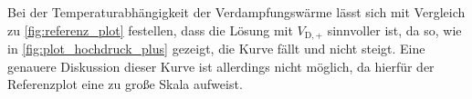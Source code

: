 Bei der Temperaturabhängigkeit der Verdampfungswärme lässt sich mit Vergleich zu \autoref{fig:referenz_plot} festellen, dass die Lösung mit $V_{\text{D},+}$ sinnvoller ist, da so, wie in \autoref{fig:plot_hochdruck_plus} gezeigt, die Kurve fällt und nicht steigt.
Eine genauere Diskussion dieser Kurve ist allerdings nicht möglich, da hierfür der Referenzplot eine zu große Skala aufweist.
